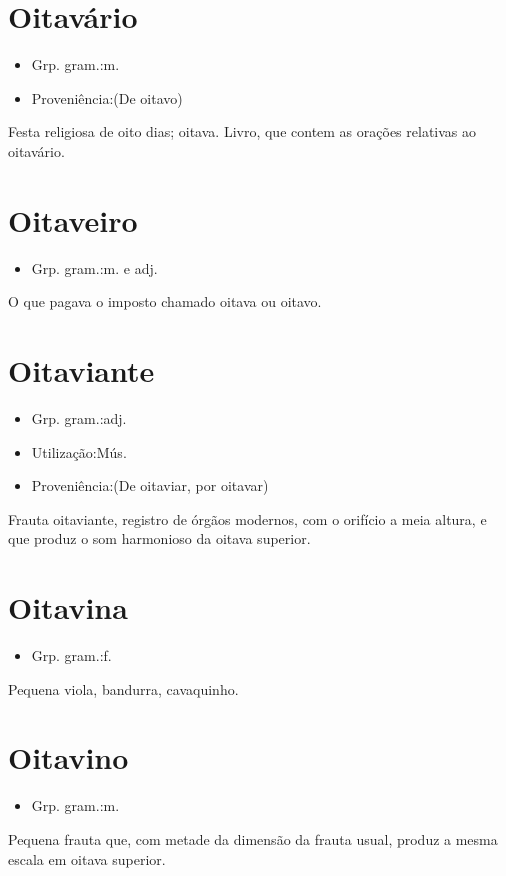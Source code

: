 \section{Oitavário}
\begin{itemize}
\item {Grp. gram.:m.}
\end{itemize}
\begin{itemize}
\item {Proveniência:(De \textunderscore oitavo\textunderscore )}
\end{itemize}
Festa religiosa de oito dias; oitava.
Livro, que contem as orações relativas ao oitavário.
\section{Oitaveiro}
\begin{itemize}
\item {Grp. gram.:m.  e  adj.}
\end{itemize}
O que pagava o imposto chamado oitava ou oitavo.
\section{Oitaviante}
\begin{itemize}
\item {Grp. gram.:adj.}
\end{itemize}
\begin{itemize}
\item {Utilização:Mús.}
\end{itemize}
\begin{itemize}
\item {Proveniência:(De \textunderscore oitaviar\textunderscore , por \textunderscore oitavar\textunderscore )}
\end{itemize}
\textunderscore Frauta oitaviante\textunderscore , registro de órgãos modernos, com o orifício a meia altura, e que produz o som harmonioso da oitava superior.
\section{Oitavina}
\begin{itemize}
\item {Grp. gram.:f.}
\end{itemize}
Pequena viola, bandurra, cavaquinho.
\section{Oitavino}
\begin{itemize}
\item {Grp. gram.:m.}
\end{itemize}
Pequena frauta que, com metade da dimensão da frauta usual, produz a mesma escala em oitava superior.
